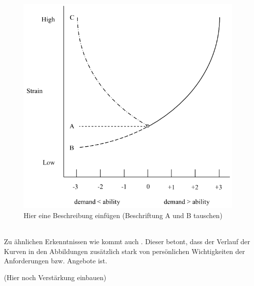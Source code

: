 \begin{figure}[h]
	\centering
	\includegraphics[width=1\textwidth]{gfx/ueberschuss_demand_abilities.png}
	\caption{Hier eine Beschreibung einfügen (Beschriftung A und B tauschen) \cite[S. 23]{edwards:2008}}
	\label{fig:personEnvironmentFit:auswirkungenErhoehterAngebote:abb2}
\end{figure}
\\
Zu ähnlichen Erkenntnissen wie \textcite{caplan:1987, copingAndAdaption:1974, harrison:1978, mechanismsOfJobStressAndStrain:1982} kommt auch \textcite{locke:1969}. Dieser betont, dass der Verlauf der Kurven in den Abbildungen zusätzlich stark von persönlichen Wichtigkeiten der Anforderungen bzw. Angebote ist. 
\newpage

(Hier noch Verstärkung einbauen)
